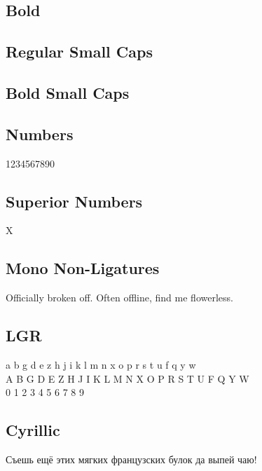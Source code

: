 \documentclass{article}
\begin{document}
\subsection*{Bold}

\textbf{\lipsum[2]}

\subsection*{Regular Small Caps}
\textsc{\lipsum[1]}

\subsection*{Bold Small Caps}

\textsc{\textbf{\lipsum[3]}}


\subsection*{Numbers}

1234567890

\subsection*{Superior Numbers}

X

\subsection*{Mono Non-Ligatures}


Officially broken off. Often offline, find me flowerless.


\subsection*{LGR}

{\notomonocondensedlgr\noindent
 a b g d e z h j i k l m n x o p r s t u f q y w\\
 A B G D E Z H J I K L M N X O P R S T U F Q Y W\\
 0 1 2 3 4 5 6 7 8 9
}

\subsection*{Cyrillic}

{\ifxetex\else\ifluatex\else{}\selectfont\fi\fi
Съешь ещё этих мягких французских булок да
выпей чаю!}
\end{document}
